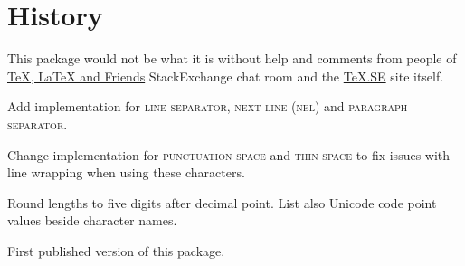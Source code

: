 \documentclass[paper=B5,DIV=calc,parskip=half]{scrartcl}
\newcommand{\punctsp}{\textsc{punctuation space}}
\newcommand{\thinsp}{\textsc{thin space}}
\newcommand{\linesep}{\textsc{line separator}}
\newcommand{\nel}{\textsc{next line (nel)}}
\newcommand{\parasep}{\textsc{paragraph separator}}
\begin{document}
\section{History}%
%
This package would not be what it is without help and comments from people of
\href{http://chat.stackexchange.com/rooms/41/tex-latex-and-friends}{\TeX{},
  \LaTeX{} and Friends} StackExchange chat room and the
\href{http://tex.stackexchange.com/}{\TeX.SE} site itself.

\begin{description}[style=nextline, labelwidth=4.5em, leftmargin=!,
  labelindent=0em]
  \item[\texttt{v0.04}] Add implementation for \linesep{}, \nel{}
    and \parasep{}.
  \item[\texttt{v0.03}] Change implementation for \punctsp{} and \thinsp{} to
    fix issues with line wrapping when using these characters.
  \item[\texttt{v0.02}] Round lengths to five digits after decimal
    point. List also Unicode code point values beside character names.
  \item[\texttt{v0.01}] First published version of this package.
\end{description}
\end{document}
